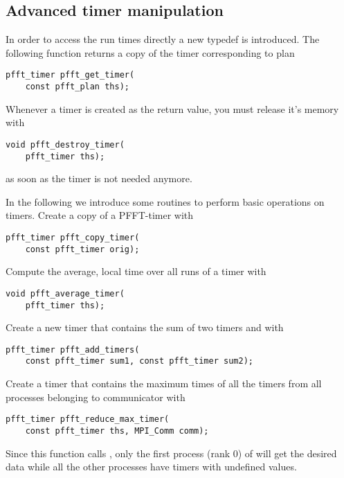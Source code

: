 \subsection{Advanced timer manipulation}
In order to access the run times directly a new typedef  is introduced.
The following function returns a copy of the timer corresponding to plan 
\begin{lstlisting}
pfft_timer pfft_get_timer(
    const pfft_plan ths);
\end{lstlisting}
Whenever a timer is created as the return value, you must release it's memory with
\begin{lstlisting}
void pfft_destroy_timer(
    pfft_timer ths);
\end{lstlisting}
as soon as the timer is not needed anymore. 

In the following we introduce some routines to perform basic operations on timers.
Create a copy of a PFFT-timer  with
\begin{lstlisting}
pfft_timer pfft_copy_timer(
    const pfft_timer orig);
\end{lstlisting}
Compute the average, local time over all runs of a timer  with
\begin{lstlisting}
void pfft_average_timer(
    pfft_timer ths);
\end{lstlisting}
Create a new timer that contains the sum of two timers  and  with
\begin{lstlisting}
pfft_timer pfft_add_timers(
    const pfft_timer sum1, const pfft_timer sum2);
\end{lstlisting}
Create a timer that contains the maximum times of all the timers  from all processes belonging to communicator  with
\begin{lstlisting}
pfft_timer pfft_reduce_max_timer(
    const pfft_timer ths, MPI_Comm comm);
\end{lstlisting}
Since this function calls , only the first process (rank 0) of  will get the desired data while all
the other processes have timers with undefined values.

